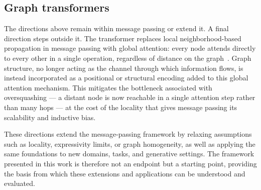 \subsection{Graph transformers}
\label{sec:future-transformers}

The directions above remain within message passing or extend it. 
A final direction steps outside it. The transformer replaces local neighborhood-based 
propagation in message passing with global attention: every node attends directly 
to every other in a single operation, regardless of distance on the graph~\cite{ying2021}. 
Graph structure, no longer acting as the channel through which information flows, 
is instead incorporated as a positional or structural encoding added to this 
global attention mechanism. This mitigates the bottleneck associated with 
oversquashing --- a distant node is now reachable in a single attention step rather than 
many hops --- at the cost of the locality that gives message passing its scalability and inductive bias.

These directions extend the message-passing framework by relaxing assumptions such as locality,
expressivity limits, or graph homogeneity, as well as applying the same foundations to 
new domains, tasks, and generative settings. The framework presented in this work is therefore 
not an endpoint but a starting point, providing the basis from which these extensions and 
applications can be understood and evaluated.

